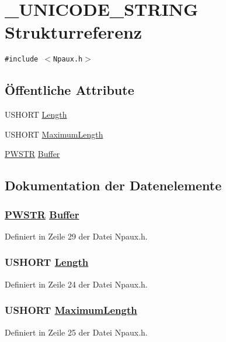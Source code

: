 \hypertarget{struct__UNICODE__STRING}{
\section{\_\-UNICODE\_\-STRING Strukturreferenz}
\label{struct__UNICODE__STRING}
}
{\tt \#include $<$Npaux.h$>$}

\subsection*{\"{O}ffentliche Attribute}
\begin{CompactItemize}
\item 
USHORT \hyperlink{struct__UNICODE__STRING___UNICODE__STRINGo0}{Length}
\item 
USHORT \hyperlink{struct__UNICODE__STRING___UNICODE__STRINGo1}{Maximum\-Length}
\item 
\hyperlink{QbeGina_8h_a8}{PWSTR} \hyperlink{struct__UNICODE__STRING___UNICODE__STRINGo2}{Buffer}
\end{CompactItemize}


\subsection{Dokumentation der Datenelemente}
\hypertarget{struct__UNICODE__STRING___UNICODE__STRINGo2}{
\subsubsection[Buffer]{\setlength{\rightskip}{0pt plus 5cm}\hyperlink{QbeGina_8h_a8}{PWSTR} \hyperlink{struct__UNICODE__STRING___UNICODE__STRINGo2}{Buffer}}}
\label{struct__UNICODE__STRING___UNICODE__STRINGo2}




Definiert in Zeile 29 der Datei Npaux.h.\hypertarget{struct__UNICODE__STRING___UNICODE__STRINGo0}{
\subsubsection[Length]{\setlength{\rightskip}{0pt plus 5cm}USHORT \hyperlink{struct__UNICODE__STRING___UNICODE__STRINGo0}{Length}}}
\label{struct__UNICODE__STRING___UNICODE__STRINGo0}




Definiert in Zeile 24 der Datei Npaux.h.\hypertarget{struct__UNICODE__STRING___UNICODE__STRINGo1}{
\subsubsection[MaximumLength]{\setlength{\rightskip}{0pt plus 5cm}USHORT \hyperlink{struct__UNICODE__STRING___UNICODE__STRINGo1}{Maximum\-Length}}}
\label{struct__UNICODE__STRING___UNICODE__STRINGo1}




Definiert in Zeile 25 der Datei Npaux.h.